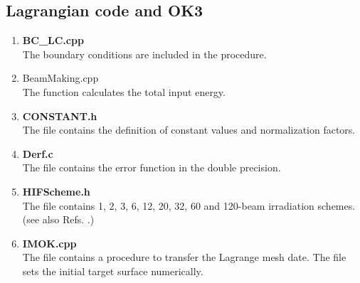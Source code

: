 %


\subsection{Lagrangian code and OK3}
\begin{enumerate}
\item {\bf BC\_LC.cpp}\\
The boundary conditions are included in the procedure.
\item {BeamMaking.cpp}\\
The function calculates the total input energy.
\item {\bf CONSTANT.h}\\
The file contains the definition of constant values and normalization factors.
\item {\bf Derf.c}\\
The file contains the error function in the double precision.
\item {\bf HIFScheme.h}\\
The file contains 1, 2, 3, 6, 12, 20, 32, 60 and 120-beam irradiation schemes. (see also Refs. \cite{ogoyski1, ogoyski2, ogoyski3}.)
\item {\bf IMOK.cpp}\\
The file contains a procedure to transfer the Lagrange mesh date. The file sets the initial target surface numerically.


\end{enumerate}
